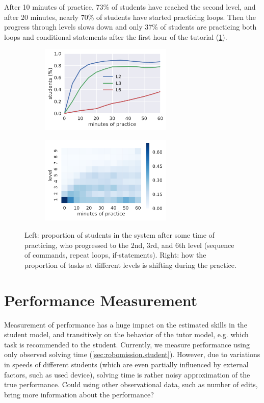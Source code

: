 After 10 minutes of practice, 73\% of students have reached the second level,
and after 20 minutes, nearly 70\% of students have started practicing loops.
Then the progress through levels slows down and only 37\% of students
are practicing both loops and conditional statements after the first
hour of the tutorial (\cref{fig:students-at-levels}).

\begin{figure}[htb]
\centering
\begin{subfigure}{.49\textwidth}
\centering
\includegraphics[height=42mm]{img/students-at-levels}
\end{subfigure}
\begin{subfigure}{.49\textwidth}
\centering
\includegraphics[height=42mm]{img/task-sessions-at-levels}
\end{subfigure}
\caption{%
  Left: proportion of students in the system after some time of practicing,
  who progressed to the 2nd, 3rd, and 6th level (sequence of commands, repeat loops, if-statements).
  Right: how the proportion of tasks at different levels is shifting during the practice.}
\label{fig:students-at-levels}
\end{figure}

\section{Performance Measurement}

Measurement of performance has a huge impact on the estimated skills in the student model,
and transitively on the behavior of the tutor model, e.g. which task is recommended
to the student.
Currently, we measure %
performance using only observed solving time
(\cref{sec:robomission.student}).
However, due to variations in speeds of different students
(which are even partially influenced by external factors, such as used device),
solving time is rather noisy approximation of the true performance.
Could using other observational data, such as number of edits,
bring more information about the performance?

